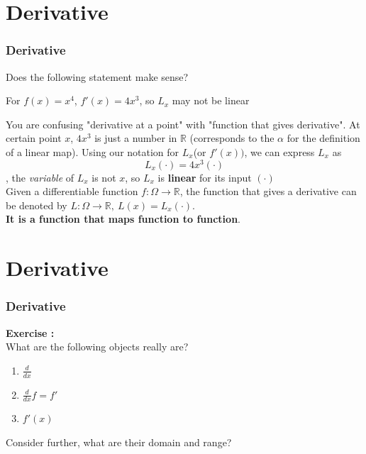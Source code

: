 \documentclass[12pt, t]{beamer}
\renewcommand{\emph}[1]{{\color{Turquoise3}\textsl{#1}}}
\begin{document}
\section{Derivative}
\begin{frame}
    \frametitle{Derivative}
    Does the following statement make sense?

    \vspace{0.5em}
    \begin{center}
        For $f(x)=x^4$, $f'(x)=4x^3$, so $L_x$ may not be linear
    \end{center}
    \vspace{0.5em}

    \hspace{1em} You are confusing "derivative at a point" with "function that gives derivative".
    At certain point $x$, $4x^3$ is just a number in $\mathbb{R}$ (corresponds to the $\alpha$ for the definition of a linear map).
    Using our notation for $L_x$(or $f'(x))$, we can express $L_x$ as
    \begin{equation*}
        L_x(\cdot)=4x^3(\cdot)
    \end{equation*}
    , the \emph{variable} of $L_x$ is not $x$, so $L_x$ is \textbf{linear} for its input $(\cdot)$\\
    \vspace{1em}
    Given a differentiable function $f:\Omega\rightarrow\mathbb{R}$, the function
    that gives a derivative can be denoted by $L:\Omega\rightarrow\mathbb{R},\ L(x)=L_x(\cdot)$.\\
    \textbf{It is a function that maps function to function}.
\end{frame}


\section{Derivative}
\begin{frame}
    \frametitle{Derivative}
    \textbf{Exercise : }\\
    \vspace{0.5em}
    \hspace{1em}
    What are the following objects really are?

    \begin{enumerate}
        \item $\frac{d}{dx}$
              \vspace{1em}
        \item $\frac{d}{dx}f=f'$
              \vspace{1em}
        \item $f'(x)$
              \vspace{1em}
    \end{enumerate}

    Consider further, what are their domain and range?
\end{frame}
\end{document}
